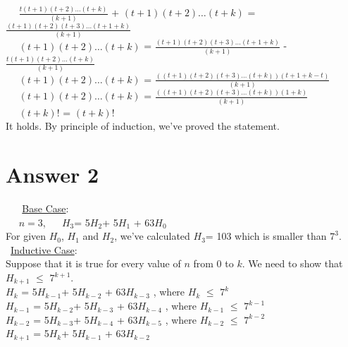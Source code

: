 ﻿\documentclass[12pt]{article}
\begin{document}
$\quad$     
    $\frac{t(t+1)(t+2)\ldots(t+k)}{(k+1)}$ $+$ $(t+1)(t+2)\ldots(t+k)$ = $\frac{(t+1)(t+2)(t+3)\ldots(t+1+k)}{(k+1)}$\\
    
$\quad$    
    $(t+1)(t+2)\ldots(t+k)$ = $\frac{(t+1)(t+2)(t+3)\ldots(t+1+k)}{(k+1)}$ -  $\frac{t(t+1)(t+2)\ldots(t+k)}{(k+1)}$ \\
    
$\quad$
	$(t+1)(t+2)\ldots(t+k)$ = $\frac{((t+1)(t+2)(t+3)\ldots(t+k))(t+1+k-t)}{(k+1)}$ \\
    
$\quad$  
    $(t+1)(t+2)\ldots(t+k)$ = $\frac{((t+1)(t+2)(t+3)\ldots(t+k))(1+k)}{(k+1)}$ \\
    
$\quad$  
	$(t+k)!$ = $(t+k)!$\\
    
It holds. By principle of induction, we've proved the statement.\\

\section*{Answer 2}

$\,$ $\,$ $\,$ $\,$\underline{Base Case}:\\

$\quad$
	$n=3$, $\quad$ $H_3$= 5$H_2$+ 5$H_1$ + 63$H_0$ \\
    
For given $H_0$, $H_1$ and $H_2$, we've calculated $H_3$= 103 which is smaller than $7^3$.\\
    
\,
\underline{Inductive Case}:\\

Suppose that it is true for every value of $n$ from 0 to $k$. We need to show that $H_{k+1}$ $\leq$ $7^{k+1}$.\\
    
$H_k$ = 5$H_{k-1}$+ 5$H_{k-2}$ + 63$H_{k-3}$ , where $H_{k}$ $\leq$ $7^{k}$\\

$H_{k-1}$ = 5$H_{k-2}$+ 5$H_{k-3}$ + 63$H_{k-4}$ , where $H_{k-1}$ $\leq$ $7^{k-1}$\\

$H_{k-2}$ = 5$H_{k-3}$+ 5$H_{k-4}$ + 63$H_{k-5}$ , where $H_{k-2}$ $\leq$ $7^{k-2}$\\

$H_{k+1}$ = 5$H_{k}$+ 5$H_{k-1}$ + 63$H_{k-2}$\\
\end{document}
